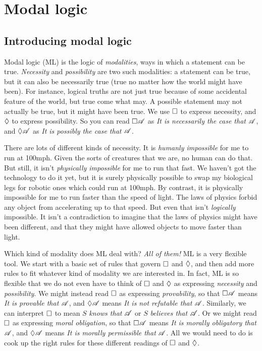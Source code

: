 
\part{Modal logic}
\label{ch.ML}

\chapter{Introducing modal logic}
\label{Intro}

Modal logic (ML) is the logic of \emph{modalities}, ways in which a statement can be true. \emph{Necessity} and \emph{possibility} are two such modalities: a statement can be true, but it can also be necessarily true (true no matter how the world might have been). For instance, logical truths are not just true because of some accidental feature of the world, but true come what may. A possible statement may not actually be true, but it might have been true. We use $\Box$ to express necessity, and $\Diamond$ to express possibility. So you can read $\Box \mathscr{A}$ as \emph{It is necessarily the case that} $\mathscr{A}$, and $\Diamond \mathscr{A}$ as \emph{It is possibly the case that} $\mathscr{A}$.

There are lots of different kinds of necessity. It is \emph{humanly impossible} for me to run at 100mph. Given the sorts of creatures that we are, no human can do that. But still, it isn't \emph{physically impossible} for me to run that fast. We haven't got the technology to do it yet, but it is surely physically possible to swap my biological legs for robotic ones which could run at 100mph. By contrast, it is physically impossible for me to run faster than the speed of light. The laws of physics forbid any object from accelerating up to that speed. But even that isn't \emph{logically} impossible. It isn't a contradiction to imagine that the laws of physics might have been different, and that they might have allowed objects to move faster than light.

Which kind of modality does ML deal with? \emph{All of them!} ML is a very flexible tool. We start with a basic set of rules that govern $\Box$ and $\Diamond$, and then add more rules to fit whatever kind of modality we are interested in. In fact, ML is so flexible that we do not even have to think of $\Box$ and $\Diamond$ as expressing \emph{necessity} and \emph{possibility}. We might instead read $\Box$ as expressing \emph{provability}, so that $\Box\mathscr{A}$ means \emph{It is provable that} $\mathscr{A}$, and $\Diamond\mathscr{A}$ means \emph{It is not refutable that} $\mathscr{A}$. Similarly, we can interpret $\Box$ to mean $S$ \emph{knows that $\mathscr{A}$} or $S$ \emph{believes that $\mathscr{A}$}. Or we might read $\Box$ as expressing \emph{moral obligation}, so that $\Box \mathscr{A}$ means \emph{It is morally obligatory that} $\mathscr{A}$, and $\Diamond \mathscr{A}$ means \emph{It is morally permissible that} $\mathscr{A}$. All we would need to do is cook up the right rules for these different readings of $\Box$ and $\Diamond$.

